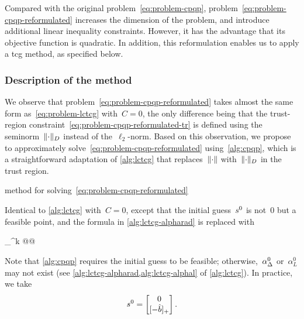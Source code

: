 Compared with the original problem~\cref{eq:problem-cpqp}, problem~\cref{eq:problem-cpqp-reformulated} increases the dimension of the problem, and introduce additional linear inequality constraints.
However, it has the advantage that its objective function is quadratic.
In addition, this reformulation enables us to apply a \gls{tcg} method, as specified below.

\subsubsection{Description of the  method}

We observe that problem~\cref{eq:problem-cpqp-reformulated} takes almost the same form as~\cref{eq:problem-lctcg} with~$C = 0$, the only difference being that the trust-region constraint~\cref{eq:problem-cpqp-reformulated-tr} is defined using the seminorm~$\lVert\cdot\rVert_D$ instead of the~$\ell_2$-norm.
Based on this observation, we propose to approximately solve~\cref{eq:problem-cpqp-reformulated} using~\cref{alg:cpqp}, which is a straightforward adaptation of \cref{alg:lctcg} that replaces~$\lVert\cdot\rVert$ with~$\lVert\cdot\rVert_D$ in the trust region.

\begin{algorithm}
    \caption{ method for solving~\cref{eq:problem-cpqp-reformulated}}
    \label{alg:cpqp}
    \DontPrintSemicolon
    \onehalfspacing
    \nonl Identical to \cref{alg:lctcg} with~$C = 0$, except that the initial guess~$\sstep[0]$ is not~$0$ but a feasible point, and the formula in \cref{alg:lctcg-alpharad} is replaced with
    \begin{algomathdisplay}
        \alpha_{\rad}^k \gets \argmax @@ 
    \end{algomathdisplay}
\end{algorithm}

Note that \cref{alg:cpqp} requires the initial guess to be feasible; otherwise,~$\alpha_{\rad}^0$ or~$\alpha_L^0$ may not exist (see \cref{alg:lctcg-alpharad,alg:lctcg-alphal} of \cref{alg:lctcg}).
In practice, we take
\begin{equation*}
    \sstep[0] =
    \begin{bmatrix}
        0\\
        \posp{-\hat{b}}
    \end{bmatrix}.
\end{equation*}

